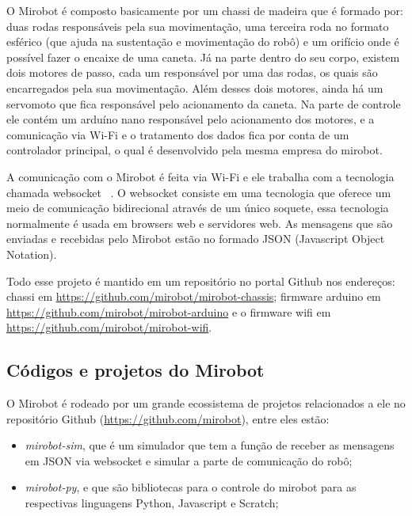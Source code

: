 O Mirobot é composto basicamente por um chassi de madeira que é formado por:
duas rodas responsáveis pela sua movimentação, uma terceira roda no formato
esférico (que ajuda na sustentação e movimentação do robô) e um orifício onde é
possível fazer o encaixe de uma caneta.
Já na parte dentro do seu corpo,
existem dois motores de passo, cada um responsável por uma das rodas, os quais
são encarregados pela sua movimentação. 
Além desses dois motores, ainda há um
servomoto que fica responsável pelo acionamento da caneta. 
Na parte de controle
ele contém um arduíno nano responsável pelo acionamento dos motores, e a
comunicação via Wi-Fi e o tratamento dos dados fica por conta de um controlador
principal, o qual é desenvolvido pela mesma empresa do mirobot.

A comunicação com o Mirobot é feita via Wi-Fi e ele trabalha com a tecnologia
chamada websocket ~\cite{websocket2011}. O websocket consiste em uma tecnologia que oferece um meio
de comunicação bidirecional através de um único soquete, essa tecnologia
normalmente é usada em browsers web e servidores web. 
As mensagens que são
enviadas e recebidas pelo Mirobot estão no formado JSON (Javascript Object
Notation).

Todo esse projeto é mantido em um repositório no portal Github nos endereços: chassi em \url{https://github.com/mirobot/mirobot-chassis}; firmware arduino em \url{https://github.com/mirobot/mirobot-arduino} e o firmware wifi em \url{https://github.com/mirobot/mirobot-wifi}.

\subsection{Códigos e projetos do Mirobot}
\label{subsec:mirobotcodigos}


O Mirobot é rodeado por um grande ecossistema de projetos relacionados a ele no
repositório Github (\url{https://github.com/mirobot}), entre eles estão:

\begin{itemize}
    \item \textit{mirobot-sim}, que é um simulador
que tem a função de receber as mensagens em JSON via websocket e simular a
parte de comunicação do robô;
    \item \textit{mirobot-py},  e  que são
bibliotecas para o controle do mirobot para as respectivas linguagens Python,
Javascript e Scratch;
\end{itemize}

